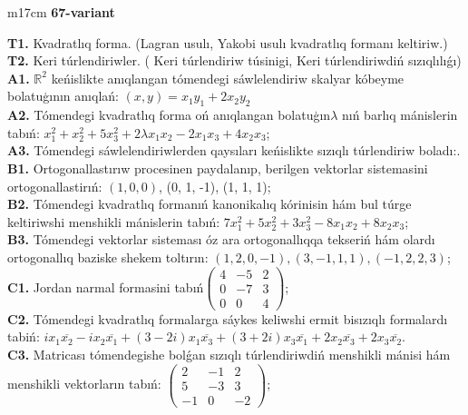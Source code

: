 \documentclass{article}
\begin{document}
\begin{tabular}{m{17cm}}
\textbf{67-variant}
\newline

\textbf{T1.} Kvadratlıq forma. (Lagran usulı, Yakobi usulı kvadratlıq formanı keltiriw.) \\
\textbf{T2.} Keri túrlendiriwler. ( Keri túrlendiriw túsinigi,   Keri túrlendiriwdiń sızıqlılıǵı) \\
\textbf{A1.} \(\mathbb{R}^{2}\) keńislikte anıqlangan tómendegi sáwlelendiriw skalyar kóbeyme bolatuģının anıqlań: \((x,y) = x_{1}y_{1} + 2x_{2}y_{2}\) \\
\textbf{A2.} Tómendegi kvadratlıq forma oń anıqlangan bolatuģın\(\lambda\) nıń barlıq mánislerin tabıń: \(x_{1}^{2} + x_{2}^{2} + 5x_{3}^{2} + 2\lambda x_{1}x_{2} - 2x_{1}x_{3} + 4x_{2}x_{3}\); \\
\textbf{A3.} Tómendegi sáwlelendiriwlerden qaysıları keńislikte sızıqlı túrlendiriw boladı:. \\
\textbf{B1.} Ortogonallastırıw procesinen paydalanıp, berilgen vektorlar sistemasini ortogonallastirıń: \((1,0,0)\), (0, 1, -1), (1, 1, 1); \\
\textbf{B2.} Tómendegi kvadratlıq formanıń kanonikalıq kórinisin hám bul túrge keltiriwshi menshikli mánislerin tabıń: \(7x_{1}^{2} + 5x_{2}^{2} + 3x_{3}^{2} - 8x_{1}x_{2} + 8x_{2}x_{3}\); \\
\textbf{B3.} Tómendegi vektorlar sisteması óz ara ortogonallıqqa tekseriń hám olardı ortogonallıq baziske shekem toltırın: \((1,2,0, - 1),(3, - 1,1,1),( - 1,2,2,3)\); \\
\textbf{C1.} Jordan narmal formasini tabıń\(\begin{pmatrix} 4 & - 5 & 2 \\ 0 & - 7 & 3 \\ 0 & 0 & 4 \end{pmatrix}\); \\
\textbf{C2.} Tómendegi kvadratlıq formalarga sáykes keliwshi ermit bisızıqlı formalardı tabiń: \(ix_{1}\overline{x_{2}} - ix_{2}\overline{x_{1}} + (3 - 2i)x_{1}\overline{x_{3}} + (3 + 2i)x_{3}\overline{x_{1}} + 2x_{2}\overline{x_{3}} + 2x_{3}\overline{x_{2}}\). \\
\textbf{C3.} Matricası tómendegishe bolǵan sızıqlı túrlendiriwdiń menshikli mánisi hám menshikli vektorların tabıń: \(\begin{pmatrix} 2 & - 1 & 2 \\ 5 & - 3 & 3 \\  - 1 & 0 & - 2 \end{pmatrix}\); \\

\end{tabular}
\vspace{1cm}
\end{document}
